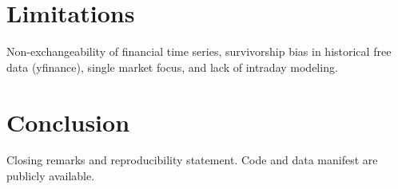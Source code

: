 \documentclass[5p,times]{elsarticle}
\begin{document}
\section{Limitations}
Non-exchangeability of financial time series, survivorship bias in historical free data (yfinance), single market focus, and lack of intraday modeling.

\section{Conclusion}
Closing remarks and reproducibility statement. Code and data manifest are publicly available.



\end{document}
